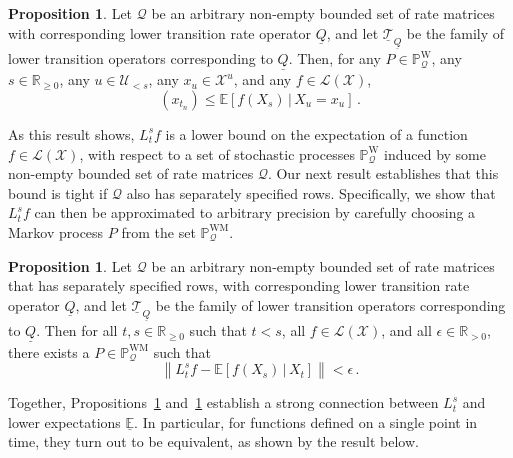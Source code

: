 \documentclass[10pt]{paper}
\theoremstyle{definition}
\newtheorem{proposition}[theorem]{Proposition}
\newcommand{\reals}{\mathbb{R}}
\newcommand{\realspos}{\reals_{>0}}
\newcommand{\realsnonneg}{\reals_{\geq 0}}
\newcommand{\states}{\mathcal{X}}
\newcommand{\processes}{\mathbb{P}}
\newcommand{\wprocesses}{\processes^{\mathrm{W}}}
\newcommand{\wmprocesses}{\processes^{\mathrm{WM}}}
\newcommand{\lbound}{L}
\newcommand{\gambles}{\mathcal{L}}
\newcommand{\gamblesX}{\gambles(\states)}
\newcommand{\rateset}{\mathcal{Q}}
\newcommand{\lrate}{\underline{Q}}
\newcommand{\norm}[1]{\left\lVert #1 \right\rVert}
\begin{document}
\begin{proposition}\label{theorem:nonmarkov_single_var_lower_bounded}
Let $\rateset$ be an arbitrary non-empty bounded set of rate matrices with corresponding lower transition rate operator $\lrate$, and let $\underline{\mathcal{T}}_{\lrate}$ be the family of lower transition operators corresponding to $\lrate$. Then, for any $P\in\wprocesses_\rateset$, any $s\in\realsnonneg$, any $u\in\mathcal{U}_{<s}$, any $x_u\in\states^u$, and any $f\in\gamblesX$,
\begin{equation*}
[L_{t_n}^s f](x_{t_n}) \leq \mathbb{E}[f(X_s)\,\vert\,X_u=x_u]\,.
\end{equation*}
\end{proposition}

As this result shows, $L_t^sf$ is a lower bound on the expectation of a function $f\in\gamblesX$, with respect to a set of stochastic processes $\wprocesses_\rateset$ induced by some non-empty bounded set of rate matrices $\rateset$. Our next result establishes that this bound is tight if $\rateset$ also has separately specified rows. Specifically, we show that $L_t^sf$ can then be approximated to arbitrary precision by carefully choosing a Markov process $P$ from the set $\wmprocesses_\rateset$.

\begin{proposition}\label{theorem:lower_markov_bound_is_tight}
Let $\rateset$ be an arbitrary non-empty bounded set of rate matrices that has separately specified rows, with corresponding lower transition rate operator $\lrate$, and let $\underline{\mathcal{T}}_{\lrate}$ be the family of lower transition operators corresponding to $\lrate$. Then for all $t,s\in\realsnonneg$ such that $t<s$, all $f\in\gamblesX$, and all $\epsilon\in\realspos$, there exists a $P\in\wmprocesses_{\rateset}$ such that
\begin{equation*}
\norm{\lbound_t^sf-\mathbb{E}[f(X_s)\,\vert\,X_t]} < \epsilon\,.
\end{equation*}
\end{proposition}

Together, Propositions~\ref{theorem:nonmarkov_single_var_lower_bounded} and~\ref{theorem:lower_markov_bound_is_tight} establish a strong connection between $L_t^s$ and lower expectations $\underline{\mathbb{E}}$. In particular, for functions defined on a single point in time, they turn out to be equivalent, as shown by the result below.
\end{document}

